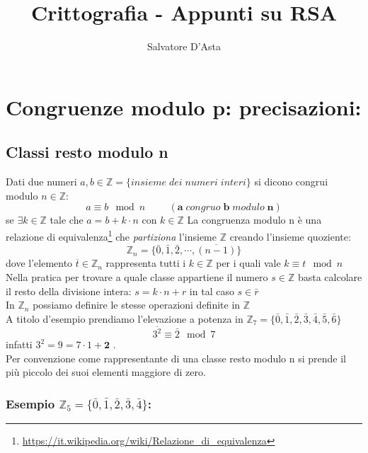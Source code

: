 \documentclass[14pt,a4paper]{article}
\title{Crittografia - Appunti su RSA}
\author{Salvatore D'Asta}
\begin{document}
	\maketitle	
	\section{Congruenze modulo p: precisazioni:}
	\subsection{Classi resto modulo n}
	Dati due numeri $ a,b \in \mathbb{Z}=\{insieme\;dei\;numeri\;interi\} $ si dicono congrui modulo $ n\in \mathbb{Z} $:
	\[ a\equiv b \mod n \hspace{1cm}(\textbf{a}\;congruo\;\textbf{b}\;modulo\;\textbf{n})\]
	se $\exists k \in \mathbb{Z}$ tale che $ a=b+k\cdot n $ con $ k \in \mathbb{Z} $
	La congruenza modulo n è una relazione di equivalenza\footnote{\url{https://it.wikipedia.org/wiki/Relazione_di_equivalenza}}
	che \textit{partiziona} l'insieme $ \mathbb{Z} $ creando l'insieme quoziente:
	\[ \mathbb{Z}_n=\{\bar{0},\bar{1},\bar{2},\cdots,\overline{(n-1)}\} \]
	dove l'elemento $ \overline{t}\in \mathbb{Z}_n $ rappresenta tutti i $ k \in \mathbb{Z} $ per i quali vale $ k\equiv t \mod n $
	Nella pratica per trovare a quale classe appartiene il numero $ s\in \mathbb{Z} $ basta calcolare il resto della divisione intera: $ s=k\cdot n+r $ in tal caso $ s\in \bar{r} $
	\\In $ \mathbb{Z}_n $ possiamo definire le stesse operazioni definite in $ \mathbb{Z} $\\
	A titolo d'esempio prendiamo l'elevazione a potenza in $ \mathbb{Z}_7=\{\bar{0},\bar{1},\bar{2},\bar{3},\bar{4},\bar{5},\bar{6}\} $
	\[ \overline{3^2}\equiv \bar{2} \mod7  \]
	infatti $ 3^2=9=7\cdot 1+\boxed{\textbf{2}} $ .\\
	Per convenzione come rappresentante di una classe resto modulo n si prende il più piccolo dei suoi elementi maggiore di zero.
	\subsubsection*{Esempio $ \mathbb{Z}_5=\{\bar{0},\bar{1},\bar{2},\bar{3},\bar{4}\} $:}
	
\end{document}
